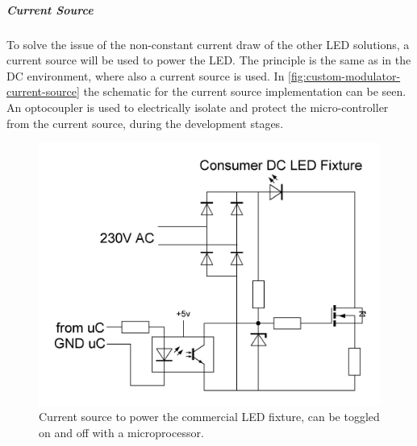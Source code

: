 


\subparagraph{Current Source}



	To solve the issue of the non-constant current draw of the other LED solutions, a current source will be used to power the LED.
	The principle is the same as in the DC environment, where also a current source is used.
	In \autoref{fig:custom-modulator-current-source} the schematic for the current source implementation can be seen.
	An optocoupler is used to electrically isolate and protect the micro-controller from the current source, during the development stages.


	\begin{figure}[h]
		\centering
		\begin{minipage}[b]{0.49\textwidth}
			\includegraphics[width=\textwidth]{chapters/hardware-chapters/AC/ac-modulator/custom-hardware/ac-current-source/custom-modulator-current-source.JPG}
			\caption{Current source to power the commercial LED fixture, can be toggled on and off with a microprocessor.}
			\label{fig:custom-modulator-current-source}
		\end{minipage}
		\hfill
		\begin{minipage}[b]{0.49\textwidth}

\end{minipage}
\end{figure}
